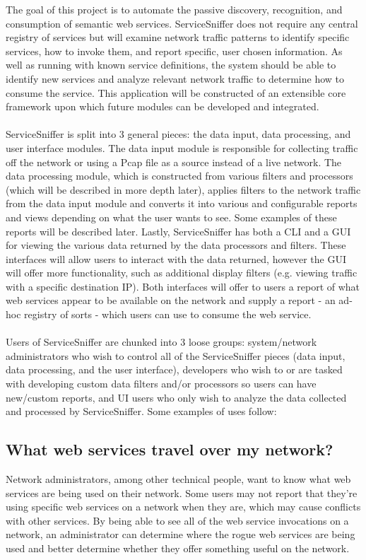 
The goal of this project is to automate the passive discovery, recognition,
and consumption of semantic web services.  ServiceSniffer does not require any
central registry of services but will examine network traffic patterns to
identify specific services, how to invoke them, and report specific, user
chosen information.  As well as running with known service definitions, the
system should be able to identify new services and analyze relevant network
traffic to determine how to consume the service.  This application will be
constructed of an extensible core framework upon which future modules can be
developed and integrated.
\\\\
ServiceSniffer is split into 3 general pieces:  the data input, data
processing, and user interface modules.  The data input module is responsible
for collecting traffic off the network or using a Pcap file as a source instead
of a live network.  The data processing module, which is constructed from
various filters and processors (which will be described in more depth later),
applies filters to the network traffic from the data input module and converts
it into various and configurable reports and views depending on what the user
wants to see.  Some examples of these reports will be described later.  Lastly,
ServiceSniffer has both a CLI and a GUI for viewing the various data returned
by the data processors and filters.  These interfaces will allow users to
interact with the data returned, however the GUI will offer more functionality,
such as additional display filters (e.g. viewing traffic with a specific
destination IP).  Both interfaces will offer to users a report of what web
services appear to be available on the network and supply a report - an ad-hoc
registry of sorts - which users can use to consume the web service.
\\\\
Users of ServiceSniffer are chunked into 3 loose groups:  system/network
administrators who wish to control all of the ServiceSniffer pieces (data
input, data processing, and the user interface), developers who wish to or are
tasked with developing custom data filters and/or processors so users can have
new/custom reports, and UI users who only wish to analyze the data collected
and processed by ServiceSniffer.  Some examples of uses follow:


\subsection*{What web services travel over my network?}
Network administrators, among other technical people, want to know what web
services are being used on their network.  Some users may not report that
they're using specific web services on a network when they are, which may cause
conflicts with other services.  By being able to see all of the web service
invocations on a network, an administrator can determine where the rogue web
services are being used and better determine whether they offer something
useful on the network.  


